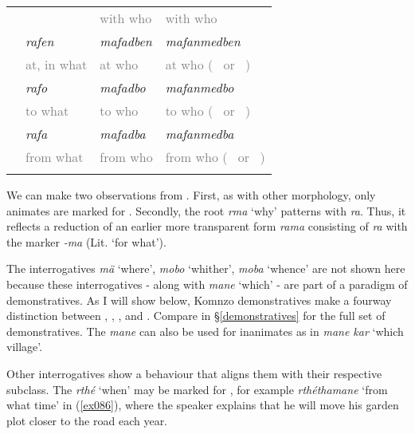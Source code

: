 \begin{table}
\begin{tabularx}{\textwidth}{XXXX}
		& &\textcolor{gray}{\footnotesize with who} &\textcolor{gray}{\footnotesize with who}\\
		\Loc &\emph{rafen} &\emph{mafadben} &\emph{mafanmedben}\\
		&\textcolor{gray}{\footnotesize at, in what}&\textcolor{gray}{\footnotesize at who} &\textcolor{gray}{\footnotesize at who (\Du~ or \Pl~)}\\
		\All &\emph{rafo} &\emph{mafadbo} &\emph{mafanmedbo}\\
		&\textcolor{gray}{\footnotesize to what} &\textcolor{gray}{\footnotesize to who} &\textcolor{gray}{\footnotesize to who (\Du~ or \Pl~)}\\
		\Abl &\emph{rafa} &\emph{mafadba} &\emph{mafanmedba}\\
		&\textcolor{gray}{\footnotesize from what} &\textcolor{gray}{\footnotesize from who} &\textcolor{gray}{\footnotesize from who (\Du~ or \Pl~)}\\
		\lspbottomrule 
	\end{tabularx}
\end{table}%

We can make two observations from . First, as with other  morphology, only animates are marked for . Secondly, the root \emph{rma} `why' patterns with \emph{ra}. Thus, it reflects a reduction of an earlier more transparent form \emph{rama} consisting of \emph{ra} with the   marker \emph{-ma} (Lit. `for what').%

The interrogatives \emph{mä} `where', \emph{mobo} `whither', \emph{moba} `whence' are not shown here because these interrogatives - along with \emph{mane} `which' - are part of a paradigm of demonstratives. As I will show below, Komnzo demonstratives make a fourway distinction between , , , and . Compare  in \S{}\ref{demonstratives} for the full set of demonstratives. The  \emph{mane}  can also be used for inanimates as in \emph{mane kar} `which village'.%

Other interrogatives show a behaviour that aligns them with their respective  subclass. The   \emph{rthé} `when' may be marked for  , for example \emph{rthéthamane} `from what time' in (\ref{ex086}), where the speaker explains that he will move his garden plot closer to the road each year.

